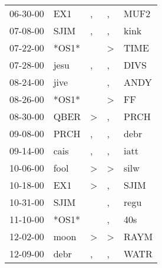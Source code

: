 \begin{supertabular}{p{0.07\textwidth}p{0.06\textwidth}p{0.02\textwidth}p{0.02\textwidth}p{0.06\textwidth}}
          06-30-00\textsuperscript{} &            EX1\textsuperscript{} &             , &             , &          MUF2\textsuperscript{} \\
          07-08-00\textsuperscript{} &           SJIM\textsuperscript{} &             , &             , &          kink\textsuperscript{} \\
          07-22-00\textsuperscript{} &                            *OS1* &               &  \textgreater &          TIME\textsuperscript{} \\
          07-28-00\textsuperscript{} &           jesu\textsuperscript{} &             , &             , &          DIVS\textsuperscript{} \\
          08-24-00\textsuperscript{} &           jive\textsuperscript{} &               &             , &          ANDY\textsuperscript{} \\
          08-26-00\textsuperscript{} &                            *OS1* &               &  \textgreater &            FF\textsuperscript{} \\
          08-30-00\textsuperscript{} &           QBER\textsuperscript{} &  \textgreater &             , &          PRCH\textsuperscript{} \\
          09-08-00\textsuperscript{} &           PRCH\textsuperscript{} &             , &             , &          debr\textsuperscript{} \\
          09-14-00\textsuperscript{} &           cais\textsuperscript{} &             , &             , &          iatt\textsuperscript{} \\
          10-06-00\textsuperscript{} &           fool\textsuperscript{} &  \textgreater &  \textgreater &          silw\textsuperscript{} \\
          10-18-00\textsuperscript{} &            EX1\textsuperscript{} &  \textgreater &             , &          SJIM\textsuperscript{} \\
          10-31-00\textsuperscript{} &           SJIM\textsuperscript{} &               &             , &          regu\textsuperscript{} \\
          11-10-00\textsuperscript{} &                            *OS1* &               &             , &           40s\textsuperscript{} \\
          12-02-00\textsuperscript{} &           moon\textsuperscript{} &  \textgreater &  \textgreater &          RAYM\textsuperscript{} \\
          12-09-00\textsuperscript{} &           debr\textsuperscript{} &             , &             , &          WATR\textsuperscript{} \\

\end{supertabular}
